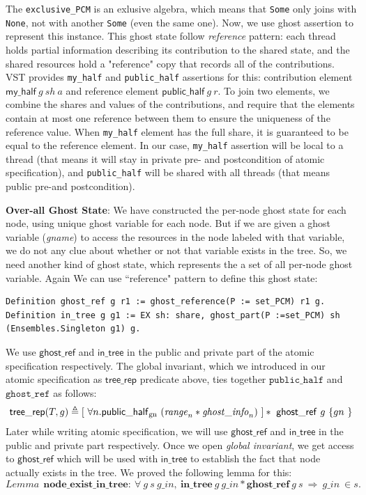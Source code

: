 \documentclass[acmsmall,screen]{acmart}\settopmatter{printfolios=true}
\begin{document}
The \texttt{exclusive\_PCM} is an exlusive algebra, which means that \texttt{Some} only joins with \texttt{None}, not with another \texttt{Some} (even the same one). Now, we use ghost assertion to represent this instance. This ghost state follow \emph{reference} pattern: each thread holds partial information describing its contribution to the shared state, and the shared resources hold a "reference" copy that records all of the contributions. VST provides \texttt{my\_half} and \texttt{public\_half} assertions for this: contribution element $\mathsf{my\_half}\ \mathit{g}\ \mathit{sh}\ a$ and reference element $\mathsf{public\_half}\ \mathit{g}\ r$. To join two elements, we combine the shares and values of the contributions, and require that the elements contain at most one reference between them to ensure the uniqueness of the reference value. When \texttt{my\_half} element has the full share, it is guaranteed to be equal to the reference element. In our case, \texttt{my\_half} assertion will be local to a thread (that means it will stay in private pre- and postcondition of atomic specification), and  \texttt{public\_half} will be shared with all threads (that means public pre-and postcondition).

\textbf{Over-all Ghost State}: We have constructed the per-node ghost state for each node, using unique ghost variable for each node. But if we are given a ghost variable (\emph{gname}) to access the resources in the node labeled with that variable, we do not any clue about whether or not that variable exists in the tree. So, we need another kind of ghost state, which represents the a set of all per-node ghost variable. Again We can use ``reference" pattern to define this ghost state:
\begin{verbatim}
Definition ghost_ref g r1 := ghost_reference(P := set_PCM) r1 g.
Definition in_tree g g1 := EX sh: share, ghost_part(P :=set_PCM) sh (Ensembles.Singleton g1) g.
\end{verbatim}
We use $\mathsf{ghost\_ref}$ and $\mathsf{in\_tree}$ in the public and private part of the atomic specification respectively. The global invariant, which we introduced in our atomic specification as $\mathsf{tree\_rep}$ predicate above, ties together $\texttt{public\_half}$ and $\texttt{ghost\_ref}$ as follows:
\begin{align*}\mathsf{tree\_rep}(T,g) \triangleq [\ \forall n. \mathsf{public\_half\textsubscript{gn}} \ (\mathit{range}_n* \mathit{ghost\_info}_n)\ ] *\ \mathsf{ghost\_ref}\ g\ \{ gn\  \} \end{align*}
 Later while writing atomic specification, we will use $\mathsf{ghost\_ref}$ and $\mathsf{in\_tree}$ in the public and private part respectively. Once we open \emph{global invariant}, we get access to $\mathsf{ghost\_ref}$ which will be used with $\mathsf{in\_tree}$ to establish the fact that node actually exists in the tree. We proved the following lemma for this:
$$
Lemma\ \mathbf{\ node\_exist\_in\_tree : }\ \forall\ g\ s\ g\_in,\  \mathbf{in\_tree}\ g\ g\_in  * \mathbf{ghost\_ref}\ g\ s\ \Rightarrow\ g\_in\ \in s .
$$
\end{document}
